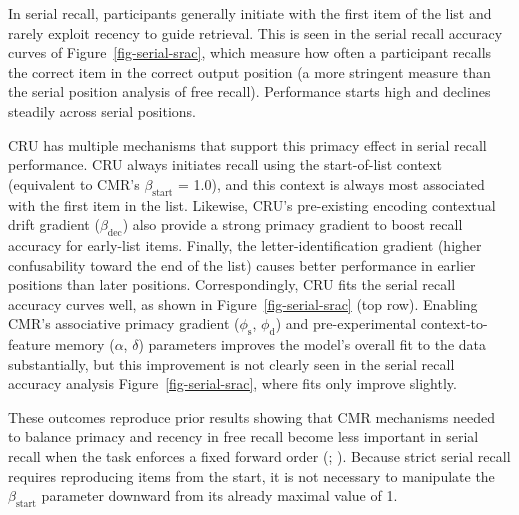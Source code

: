\documentclass[
  man,
  floatsintext,
  longtable,
  nolmodern,
  notxfonts,
  notimes,
  draftfirst,
  colorlinks=true,linkcolor=blue,citecolor=blue,urlcolor=blue]{apa7}
\begin{document}
In serial recall, participants generally initiate with the first item of
the list and rarely exploit recency to guide retrieval. This is seen in
the serial recall accuracy curves of Figure~\ref{fig-serial-srac}, which
measure how often a participant recalls the correct item in the correct
output position (a more stringent measure than the serial position
analysis of free recall). Performance starts high and declines steadily
across serial positions.

CRU has multiple mechanisms that support this primacy effect in serial
recall performance. CRU always initiates recall using the start-of-list
context (equivalent to CMR's \(\beta_\text{start}\) = 1.0), and this
context is always most associated with the first item in the list.
Likewise, CRU's pre-existing encoding contextual drift gradient
(\(\beta_\text{dec}\)) also provide a strong primacy gradient to boost
recall accuracy for early-list items. Finally, the letter-identification
gradient (higher confusability toward the end of the list) causes better
performance in earlier positions than later positions. Correspondingly,
CRU fits the serial recall accuracy curves well, as shown in
Figure~\ref{fig-serial-srac} (top row). Enabling CMR's associative
primacy gradient (\(\phi_\text{s}\), \(\phi_\text{d}\)) and
pre-experimental context-to-feature memory (\(\alpha\), \(\delta\))
parameters improves the model's overall fit to the data substantially,
but this improvement is not clearly seen in the serial recall accuracy
analysis Figure~\ref{fig-serial-srac}, where fits only improve slightly.

These outcomes reproduce prior results showing that CMR mechanisms
needed to balance primacy and recency in free recall become less
important in serial recall when the task enforces a fixed forward order
(;
). Because strict serial
recall requires reproducing items from the start, it is not necessary to
manipulate the \(\beta_\text{start}\) parameter downward from its
already maximal value of 1.
\end{document}
